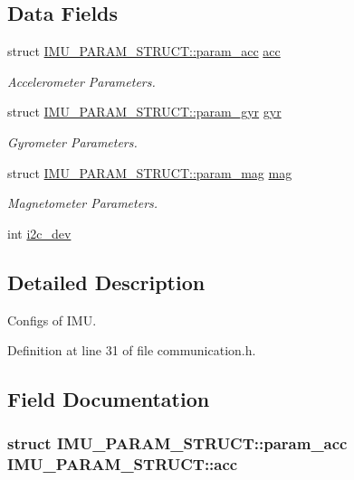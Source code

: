\subsection*{Data Fields}
\begin{DoxyCompactItemize}
\item 
struct \hyperlink{structIMU__PARAM__STRUCT_1_1param__acc}{IMU\_\-PARAM\_\-STRUCT::param\_\-acc} \hyperlink{structIMU__PARAM__STRUCT_a92172e4757d0f8f9135a659e406c12e5}{acc}
\begin{DoxyCompactList}\small\item\em Accelerometer Parameters. \item\end{DoxyCompactList}\item 
struct \hyperlink{structIMU__PARAM__STRUCT_1_1param__gyr}{IMU\_\-PARAM\_\-STRUCT::param\_\-gyr} \hyperlink{structIMU__PARAM__STRUCT_a5a4557868f1af679a1098808397b02ec}{gyr}
\begin{DoxyCompactList}\small\item\em Gyrometer Parameters. \item\end{DoxyCompactList}\item 
struct \hyperlink{structIMU__PARAM__STRUCT_1_1param__mag}{IMU\_\-PARAM\_\-STRUCT::param\_\-mag} \hyperlink{structIMU__PARAM__STRUCT_a26b277dcaf05f3842995df888225f6f4}{mag}
\begin{DoxyCompactList}\small\item\em Magnetometer Parameters. \item\end{DoxyCompactList}\item 
int \hyperlink{structIMU__PARAM__STRUCT_a8a870f383fc9ba0b682fdc9b8c0d2734}{i2c\_\-dev}
\end{DoxyCompactItemize}


\subsection{Detailed Description}
Configs of IMU. 

Definition at line 31 of file communication.h.



\subsection{Field Documentation}
\hypertarget{structIMU__PARAM__STRUCT_a92172e4757d0f8f9135a659e406c12e5}{
\subsubsection[{acc}]{\setlength{\rightskip}{0pt plus 5cm}struct {\bf IMU\_\-PARAM\_\-STRUCT::param\_\-acc} {\bf IMU\_\-PARAM\_\-STRUCT::acc}}}
\label{structIMU__PARAM__STRUCT_a92172e4757d0f8f9135a659e406c12e5}


